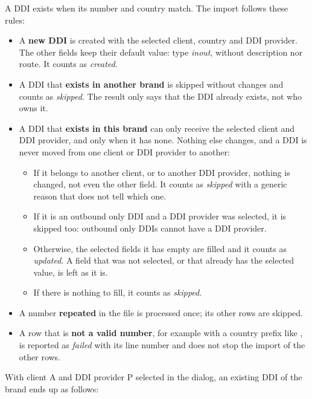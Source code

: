 \documentclass[letterpaper,10pt,english]{sphinxmanual}
\begin{document}
A DDI exists when its number and country match. The import follows these rules:
\begin{itemize}
\item {} 
A \textbf{new DDI} is created with the selected client, country and DDI provider. The other fields
keep their default value: type \emph{inout}, without description nor route. It counts as \emph{created}.

\item {} 
A DDI that \textbf{exists in another brand} is skipped without changes and counts as \emph{skipped}. The
result only says that the DDI already exists, not who owns it.

\item {} 
A DDI that \textbf{exists in this brand} can only receive the selected client and DDI provider, and
only when it has none. Nothing else changes, and a DDI is never moved from one client or DDI
provider to another:
\begin{itemize}
\item {} 
If it belongs to another client, or to another DDI provider, nothing is changed, not even the
other field. It counts as \emph{skipped} with a generic reason that does not tell which one.

\item {} 
If it is an outbound only DDI and a DDI provider was selected, it is skipped too: outbound
only DDIs cannot have a DDI provider.

\item {} 
Otherwise, the selected fields it has empty are filled and it counts as \emph{updated}. A field
that was not selected, or that already has the selected value, is left as it is.

\item {} 
If there is nothing to fill, it counts as \emph{skipped}.

\end{itemize}

\item {} 
A number \textbf{repeated} in the file is processed once; its other rows are skipped.

\item {} 
A row that is \textbf{not a valid number}, for example with a country prefix like , is
reported as \emph{failed} with its line number and does not stop the import of the other rows.

\end{itemize}

With client A and DDI provider P selected in the dialog, an existing DDI of the brand ends up as
follows:
\end{document}

